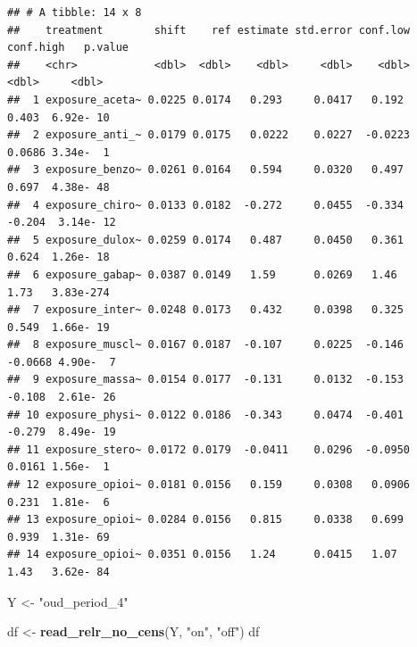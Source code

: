 \documentclass[
]{article}
\newenvironment{Shaded}{\begin{snugshade}}{\end{snugshade}}
\newcommand{\FunctionTok}[1]{\textcolor[rgb]{0.13,0.29,0.53}{\textbf{#1}}}
\newcommand{\NormalTok}[1]{#1}
\newcommand{\OtherTok}[1]{\textcolor[rgb]{0.56,0.35,0.01}{#1}}
\newcommand{\StringTok}[1]{\textcolor[rgb]{0.31,0.60,0.02}{#1}}
\begin{document}
\begin{verbatim}
## # A tibble: 14 x 8
##    treatment        shift    ref estimate std.error conf.low conf.high   p.value
##    <chr>            <dbl>  <dbl>    <dbl>     <dbl>    <dbl>     <dbl>     <dbl>
##  1 exposure_aceta~ 0.0225 0.0174   0.293     0.0417   0.192     0.403  6.92e- 10
##  2 exposure_anti_~ 0.0179 0.0175   0.0222    0.0227  -0.0223    0.0686 3.34e-  1
##  3 exposure_benzo~ 0.0261 0.0164   0.594     0.0320   0.497     0.697  4.38e- 48
##  4 exposure_chiro~ 0.0133 0.0182  -0.272     0.0455  -0.334    -0.204  3.14e- 12
##  5 exposure_dulox~ 0.0259 0.0174   0.487     0.0450   0.361     0.624  1.26e- 18
##  6 exposure_gabap~ 0.0387 0.0149   1.59      0.0269   1.46      1.73   3.83e-274
##  7 exposure_inter~ 0.0248 0.0173   0.432     0.0398   0.325     0.549  1.66e- 19
##  8 exposure_muscl~ 0.0167 0.0187  -0.107     0.0225  -0.146    -0.0668 4.90e-  7
##  9 exposure_massa~ 0.0154 0.0177  -0.131     0.0132  -0.153    -0.108  2.61e- 26
## 10 exposure_physi~ 0.0122 0.0186  -0.343     0.0474  -0.401    -0.279  8.49e- 19
## 11 exposure_stero~ 0.0172 0.0179  -0.0411    0.0296  -0.0950    0.0161 1.56e-  1
## 12 exposure_opioi~ 0.0181 0.0156   0.159     0.0308   0.0906    0.231  1.81e-  6
## 13 exposure_opioi~ 0.0284 0.0156   0.815     0.0338   0.699     0.939  1.31e- 69
## 14 exposure_opioi~ 0.0351 0.0156   1.24      0.0415   1.07      1.43   3.62e- 84
\end{verbatim}

\begin{Shaded}
\begin{Highlighting}[]
\NormalTok{Y }\OtherTok{\textless{}{-}} \StringTok{"oud\_period\_4"}

\NormalTok{df }\OtherTok{\textless{}{-}} \FunctionTok{read\_relr\_no\_cens}\NormalTok{(Y, }\StringTok{"on"}\NormalTok{, }\StringTok{"off"}\NormalTok{)}
\NormalTok{df}
\end{Highlighting}
\end{Shaded}
\end{document}
